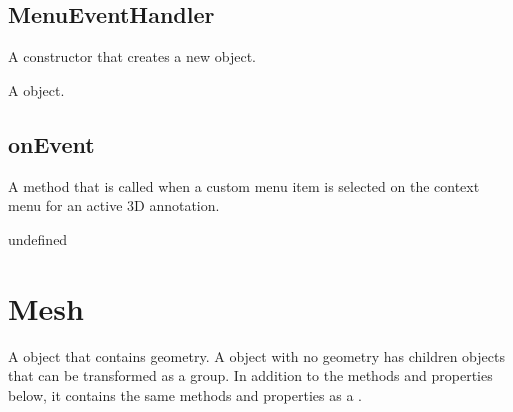 \documentclass[letterpaper,12pt,english,openany,oneside]{sphinxmanual}
\begin{document}
\subsection{MenuEventHandler}
\label{\detokenize{JS_3D_API:menueventhandler-1}}\label{\detokenize{JS_3D_API:id16}}
A constructor that creates a new  object.

\label{\detokenize{JS_3D_API:syntax-65}}

\begin{sphinxVerbatim}[commandchars=\\\{\}]
 
\end{sphinxVerbatim}
\label{\detokenize{JS_3D_API:returns-66}}

A  object.


\subsection{onEvent}
\label{\detokenize{JS_3D_API:onevent-3}}\label{\detokenize{JS_3D_API:id17}}
A method that is called when a custom menu item is selected on the context menu for an active 3D annotation.

\label{\detokenize{JS_3D_API:syntax-66}}

\begin{sphinxVerbatim}[commandchars=\\\{\}]
\end{sphinxVerbatim}
\label{\detokenize{JS_3D_API:parameters-50}}

\label{\detokenize{JS_3D_API:section-70}}\label{\detokenize{JS_3D_API:returns-67}}

undefined


\section{Mesh}
\label{\detokenize{JS_3D_API:mesh}}
A  object that contains geometry. A  object with no geometry has children  objects that can be transformed as a group. In addition to the methods and properties below, it contains the same methods and properties as a .
\end{document}
